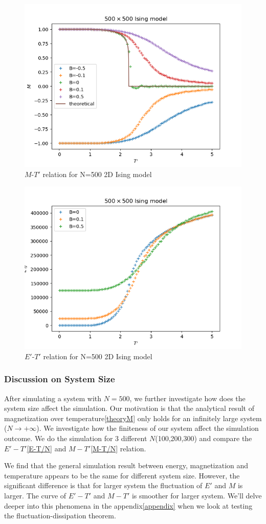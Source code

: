 \documentclass[11pt]{article}
\begin{document}
\begin{figure}
    \centering
    \includegraphics[width=0.6\linewidth]{plots/M-T_withB_diagram(latest,500).png}
    \caption{$M$-$T'$ relation for N=500 2D Ising model}
    \label{MT500here}
\end{figure}

\begin{figure}
    \centering
    \includegraphics[width=0.6\linewidth]{plots/E-T_withB_diagram(latest,500).png}
    \caption{$E'$-$T'$ relation for N=500 2D Ising model}
    \label{ET500here}
\end{figure}

\subsubsection{Discussion on System Size}

After simulating a system with $N=500$, we further investigate how does the system size affect the simulation. Our motivation is that the analytical result of magnetization over temperature\ref{theoryM} only holds for an infinitely large system ($N \rightarrow +\infty$). We investigate how the finiteness of our system affect the simulation outcome. We do the simulation for 3 different $N$(100,200,300) and compare the $E'-T'$\ref{E-T/N} and $M-T'$\ref{M-T/N} relation.

We find that the general simulation result between energy, magnetization and temperature appears to be the same for different system size. However, the significant difference is that for larger system the fluctuation of $E'$ and $M$ is larger. The curve of $E'-T'$ and $M-T'$ is smoother for larger system.\label{smoothdiscussion} We'll delve deeper into this phenomena in the appendix\ref{appendix} when we look at testing the fluctuation-dissipation theorem.
\end{document}
